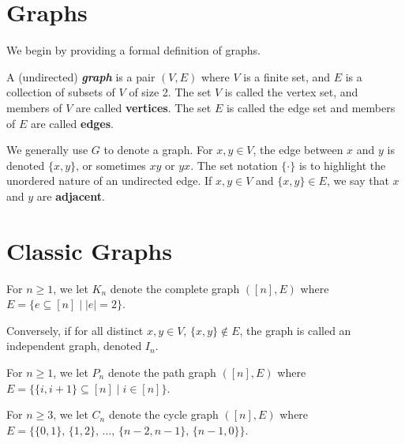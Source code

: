 \section{Graphs}

We begin by providing a formal definition of graphs.

\begin{definition}
    A (undirected) \textit{\textbf{graph}} is a pair $(V,E)$ where $V$ is a finite set, and $E$ is a collection of subsets of $V$ of size 2. The set $V$ is called the vertex set, and members of $V$ are called \textbf{vertices}. The set $E$ is called the edge set and members of $E$ are called \textbf{edges}.
\end{definition}

We generally use $G$ to denote a graph. For $x,y \in V$, the edge between $x$ and $y$ is denoted $\{x,y\}$, or sometimes $xy$ or $yx$. The set notation $\{\cdot\}$ is to highlight the unordered nature of an undirected edge. If $x, y \in V$ and $\{x,y\} \in E$, we say that $x$ and $y$ are \textbf{adjacent}.

\section{Classic Graphs}

\begin{definition}
    For $n \geq 1$, we let $K_n$ denote the complete graph $([n], E)$ where $E = \{e \subseteq [n] \mid |e| = 2\}$.
\end{definition}

Conversely, if for all distinct $x,y \in V$, $\{x,y\} \not\in E$, the graph is called an independent graph, denoted $I_n$.

\begin{definition}
    For $n \geq 1$, we let $P_n$ denote the path graph $([n], E)$ where $E = \{ \{i,i+1\} \subseteq [n] \mid i \in [n] \}$.
\end{definition}

\begin{definition}
    For $n \geq 3$, we let $C_n$ denote the cycle graph $([n], E)$ where $E = \{ \{0,1\},\, \{1,2\},\, \ldots,\, \{n-2,n-1\},\, \{n-1,0\} \}$.
\end{definition}

